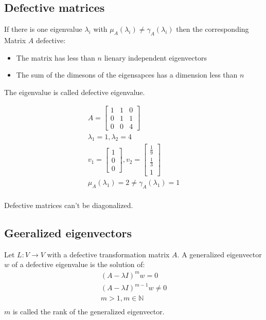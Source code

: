 \subsection{Defective matrices}
If there is one eigenvalue \(\lambda_i\) with \(\mu_A(\lambda_i) \neq \gamma_A(\lambda_i) \) then the corresponding Matrix \(A\) defective:
\begin{itemize}
    \item The matrix has less than \(n\) lienary independent eigenvectors
    \item The sum of the dimesons of the eigensapces has a dimension less than \( n\)
\end{itemize}
The eigenvalue is called defective eigenvalue.
\begin{example}
    \begin{gather*}
        A = \begin{bmatrix}
            1 & 1 & 0 \\ 0 & 1 & 1 \\ 0 & 0 & 4
        \end{bmatrix}\\
        \lambda_1 = 1, \lambda_2 = 4\\
        v_1 = \begin{bmatrix}
            1 \\ 0 \\ 0
        \end{bmatrix}, v_2 = \begin{bmatrix}
            \frac{1}{9} \\ \frac{1}{3} \\ 1
        \end{bmatrix}\\
        \mu_A(\lambda_1) = 2 \neq \gamma_A(\lambda_1) = 1 \\
    \end{gather*}
\end{example}
Defective matrices can't be diagonalized.
\subsection{Geeralized eigenvectors}
Let \(L : V \rightarrow V\) with a defective transformation matrix \(A\). A generalized eigenvector \(w\) of a defective eigenvalue is the solution of:
\begin{equation}
    \begin{split}
        \left(A - \lambda I \right)^m w = 0\\
        \left(A - \lambda I \right)^{m-1} w \neq 0 \\
        m > 1, m \in \mathbb{N}\\
    \end{split}
\end{equation}
\(m\) is called the rank of the generalized eigenvector.
